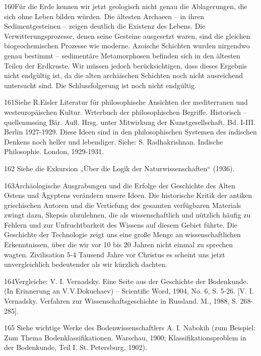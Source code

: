 \documentclass[11pt,a4paper]{book}
\begin{document}
160Für die Erde kennen wir jetzt geologisch nicht genau die Ablagerungen, die sich ohne Leben bilden würden. Die ältesten Archaeen -- in ihren Sedimentgesteinen -- zeigen deutlich die Existenz des Lebens. Die Verwitterungsprozesse, denen seine Gesteine ausgesetzt waren, sind die gleichen biogeochemischen Prozesse wie moderne. Azoische Schichten wurden nirgendwo genau bestimmt -- sedimentäre Metamorphosen befinden sich in den ältesten Teilen der Erdkruste. Wir müssen jedoch berücksichtigen, dass dieses Ergebnis nicht endgültig ist, da die alten archäischen Schichten noch nicht ausreichend untersucht sind. Die Schlussfolgerung ist noch nicht endgültig.



161Siehe R.Eisler Literatur für philosophische Ansichten der mediterranen und westeuropäischen Kultur. Wrterbuch der philosophischen Begriffe. Historisch -- quellenmssing Bär. Aufl. Hrsg. unter Mitwirkung der Kunstgesellschaft. Bd. I-III. Berlin 1927-1929. Diese Ideen sind in den philosophischen Systemen des indischen Denkens noch heller und lebendiger. Siehe: S. Radhakrishnan. Indische Philosophie. London, 1929-1931.



162 Siehe die Exkursion „Über die Logik der Naturwissenschaften“ (1936).



163Archäologische Ausgrabungen und die Erfolge der Geschichte des Alten Ostens und Ägyptens verändern unsere Ideen. Die historische Kritik der antiken griechischen Autoren und die Vertiefung des gesamten verfügbaren Materials zwingt dazu, Skepsis abzulehnen, die als wissenschaftlich und nützlich häufig zu Fehlern und zur Unfruchtbarkeit des Wissens auf diesem Gebiet führte. Die Geschichte der Technologie zeigt uns eine große Menge an wissenschaftlichen Erkenntnissen, über die wir vor 10 bis 20 Jahren nicht einmal zu sprechen wagten. Zivilisation 5-4 Tausend Jahre vor Christus es scheint uns jetzt unvergleichlich bedeutender als wir kürzlich dachten.



164Vergleiche: V. I. Vernadsky. Eine Seite aus der Geschichte der Bodenkunde. (In Erinnerung an V.V.Dokuchaev) -- Scientific Word, 1904, No. 6, S. 5-26. [V. I. Vernadsky. Verfahren zur Wissenschaftsgeschichte in Russland. M., 1988, S. 268-285].



165 Siehe wichtige Werke des Bodenwissenschaftlers A. I. Nabokih (zum Beispiel: Zum Thema Bodenklassifikationen. Warschau, 1900; Klassifikationsproblem in der Bodenkunde, Teil I. St. Petersburg, 1902).
\end{document}
